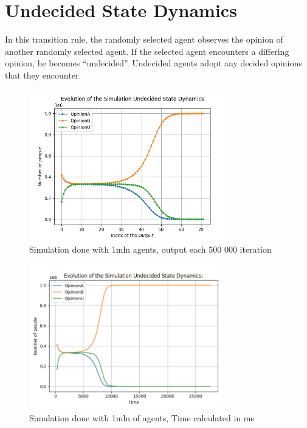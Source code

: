 \section{Undecided State Dynamics}
\label{undecided}

In this transition rule, the randomly selected agent observes the opinion of another randomly selected agent. If the selected agent encounters a differing opinion, he becomes “undecided”. Undecided agents adopt any decided opinions that they encounter.

\begin{figure}[H]
     \centering
     \includegraphics[width=0.78\textwidth,height=0.32\textheight]{img/svg/Undecided/1mln/withoutTime.png}
     \caption{Simulation done with 1mln agents, output each 500 000 iteration}
\end{figure}
\begin{figure}[H]
     \centering
     \includegraphics[width=0.75\textwidth,height=0.32\textheight]{img/svg/Undecided/1mln/withTime.png}
     \caption{Simulation done with 1mln of agents, Time calculated in ms}
\end{figure}

